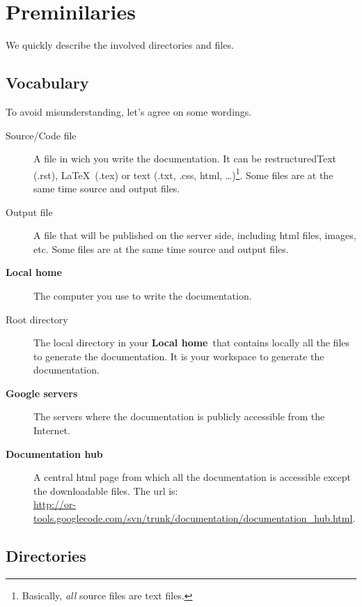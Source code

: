\documentclass[a4paper,10pt]{article}
\newcommand{\gservers}{{\bf Google servers}}
\newcommand{\lhome}{{\bf Local home}}
\newcommand{\dhub}{{\bf Documentation hub}}
\begin{document}
\setcounter{tocdepth}{2}
\tableofcontents


\section{Preminilaries}
We quickly describe the involved directories and files.

\subsection{Vocabulary}

To avoid misunderstanding, let's agree on some wordings.

\begin{description}
 \item[Source/Code file] A file in wich you write the documentation. It can be restructuredText (.rst), \LaTeX\ (.tex) or text (.txt, .css, html, \ldots)\footnote{Basically, \emph{all} source files are text files.}. Some files are at the same time source and output files.
 \item[Output file] A file that will be published on the server side, including html files, images, etc. Some files are at the same time source and output files.
 \item[\lhome] The computer you use to write the documentation.
\item[Root directory] The local directory in your \lhome\ that contains locally all the files to generate the documentation. It is your workspace to generate the documentation.
 \item[\gservers] The servers where the documentation is publicly accessible from the Internet.
 \item[\dhub] A central html page from which all the documentation is accessible except the downloadable files. The url is:\\
 \href{http://or-tools.googlecode.com/svn/trunk/documentation/documentation\_hub.html}{http://or-tools.googlecode.com/svn/trunk/documentation/documentation\_hub.html}.
\end{description}

\subsection{Directories}
\end{document}
